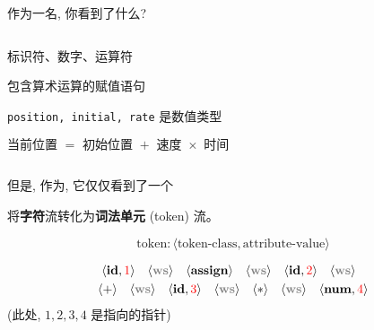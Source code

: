 \begin{frame}{}
  \begin{center}
    作为一名, 你看到了什么?

    \vspace{0.10cm}

    \vspace{0.20cm}
    \begin{columns}
        \begin{description}
          \setlength{\itemsep}{12pt}
          \pause
          \item[词法:] 标识符、数字、运算符
          \pause
          \item[语法:] 包含算术运算的赋值语句
          \pause 
          \item[语义:] \texttt{position, initial, rate} 是数值类型
          \pause
          \item[物理定律:] $\text{当前位置 } = \text{ 初始位置 } + \text{ 速度 } \times \text{ 时间}$
        \end{description}
    \end{columns}

    \pause
    \vspace{1.00cm}
    但是, 作为, 它仅仅看到了一个
  \end{center}
\end{frame}

\begin{frame}{}
  \begin{center}
     将{\bf 字符}流转化为{\bf 词法单元} (token) 流。

    \[
      \boxed{\text{token}: \langle \text{token-class}, \text{attribute-value} \rangle}
    \]


    \begin{align*}
      \langle \id, \red{1} \rangle \quad 
      \langle \ws \rangle \quad
      \langle \assign \rangle \quad
      \langle \ws \rangle \quad
      \langle \id, \red{2} \rangle \quad
      \langle \ws \rangle \quad \\
      \langle + \rangle \quad
      \langle \ws \rangle \quad
      \langle \id, \red{3} \rangle \quad
      \langle \ws \rangle \quad
      \langle \ast \rangle \quad
      \langle \ws \rangle \quad
      \langle \num, \red{4} \rangle
    \end{align*}
    (此处, $1, 2, 3, 4$ 是指向的指针)
  \end{center}
\end{frame}

